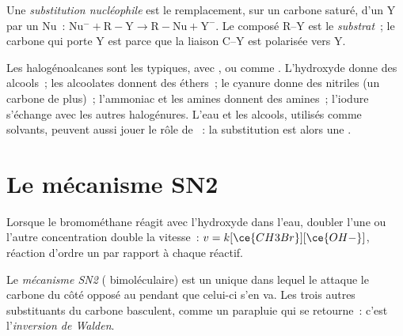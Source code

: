 \begin{definition}\label{def:b1:nucleophilic-substitution:substitution}
Une \emph{substitution nucléophile} est le
remplacement, sur un carbone saturé, d'un  Y par un
 Nu~: $\mathrm{Nu^-} + \mathrm{R{-}Y} \to \mathrm{R{-}Nu} +
\mathrm{Y^-}$. Le composé R--Y est le \emph{substrat}~;
le carbone qui porte Y est  parce que la liaison C--Y est
polarisée vers Y.
\end{definition}

Les halogénoalcanes sont les  typiques, avec , 
ou  comme . L'hydroxyde donne des alcools~; les
alcoolates donnent des éthers~; le cyanure donne des nitriles (un carbone
de plus)~; l'ammoniac et les amines donnent des amines~; l'iodure
s'échange avec les autres halogénures. L'eau et les alcools, utilisés
comme solvants, peuvent aussi jouer le rôle de ~: la
substitution est alors une .

\section{Le mécanisme SN2}

Lorsque le bromométhane réagit avec l'hydroxyde dans l'eau, doubler
l'une ou l'autre concentration double la vitesse~:
$v = k[\ce{CH3Br}][\ce{OH-}]$, réaction d'ordre un par rapport à chaque
réactif.

\begin{definition}\label{def:b1:nucleophilic-substitution:sn2}
Le \emph{mécanisme SN2} ( bimoléculaire)
est un  unique dans lequel le  attaque le
carbone du côté opposé au  pendant que celui-ci s'en va.
Les trois autres substituants du carbone basculent, comme un parapluie
qui se retourne~: c'est l'\emph{inversion de
Walden}.
\end{definition}

